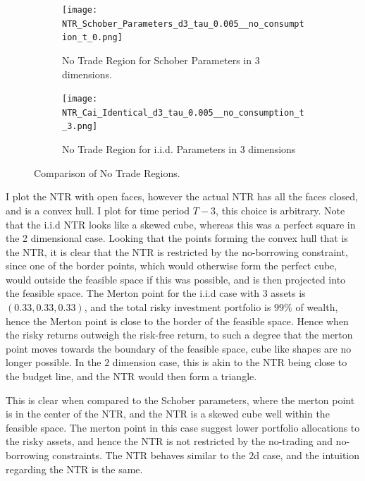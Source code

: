 \documentclass[11pt]{article}
\begin{document}
\begin{figure}[!ht]
    \centering
    \begin{subfigure}[t]{0.48\textwidth}
        \centering
        \texttt{[image: NTR\_Schober\_Parameters\_d3\_tau\_0.005\_\_no\_consumption\_t\_0.png]}
        \caption{No Trade Region for Schober Parameters in 3 dimensions.}
        \label{fig:NTR_3d_Schober}
    \end{subfigure}%
    \hfill
    \begin{subfigure}[t]{0.48\textwidth}
        \centering
        \texttt{[image: NTR\_Cai\_Identical\_d3\_tau\_0.005\_\_no\_consumption\_t\_3.png]}
        \caption{No Trade Region for i.i.d. Parameters in 3 dimensions}
        \label{fig:NTR_3d_iid_Correlation}
    \end{subfigure}

    \caption{Comparison of No Trade Regions.}
    \label{fig:comparison_NTR_3d}
\end{figure}
I plot the NTR with open faces, however the actual NTR has all the faces closed, and is a convex hull. I plot for time period $T-3$, this choice is arbitrary.
Note that the i.i.d NTR looks like a skewed cube, whereas this was a perfect square in the 2 dimensional case.
Looking that the points forming the convex hull that is the NTR, it is clear that the NTR is restricted by the no-borrowing constraint,
since one of the border points, which would otherwise form the perfect cube, would outside the feasible space if this was possible, and is then projected into the feasible space. 
The Merton point for the i.i.d case with $3$ assets is $(0.33, 0.33, 0.33)$, and the total risky investment portfolio is $99\%$ of wealth, hence the Merton point is close to the border of the feasible space.
Hence when the risky returns outweigh the risk-free return,
to such a degree that the merton point moves towards the boundary of the feasible space, cube like shapes are no longer possible.
In the $2$ dimension case, this is akin to the \ac{NTR} being close to the budget line, and the \ac{NTR} would then form a triangle.

This is clear when compared to the Schober parameters, where the merton point is in the center of the NTR, and the NTR is a skewed cube well within the feasible space.
The merton point in this case suggest lower portfolio allocations to the risky assets, and hence the NTR is not restricted by the no-trading and no-borrowing constraints.
The NTR behaves similar to the $2$d case, and the intuition regarding the NTR is the same.
\end{document}
